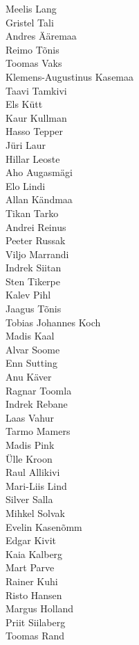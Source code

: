 \begin{multicols}{2}
Meelis Lang\\
Gristel Tali\\
Andres Ääremaa\\
Reimo Tõnis\\
Toomas Vaks\\
Klemens-Augustinus Kasemaa\\
Taavi Tamkivi\\
Els Kütt\\
Kaur Kullman\\
Hasso Tepper\\
Jüri Laur\\
Hillar Leoste\\
Aho Augasmägi\\
Elo Lindi\\
Allan Kändmaa\\
Tikan Tarko\\
Andrei Reinus\\
Peeter Russak\\
Viljo Marrandi\\
Indrek Siitan\\
Sten Tikerpe\\
Kalev Pihl\\
Jaagus Tõnis\\
Tobias Johannes Koch\\
Madis Kaal\\
Alvar Soome\\
Enn Sutting\\
Anu Käver\\
Ragnar Toomla \\
Indrek Rebane\\
Laas Vahur\\
Tarmo Mamers\\
Madis Pink\\
Ülle Kroon\\
Raul Allikivi\\
Mari-Liis Lind\\
Silver Salla\\
Mihkel Solvak\\
Evelin Kasenõmm\\
Edgar Kivit\\
Kaia Kalberg\\
Mart Parve\\
Rainer Kuhi\\
Risto Hansen\\
Margus Holland\\
 Priit Siilaberg \\
Toomas Rand\\

\end{multicols}
